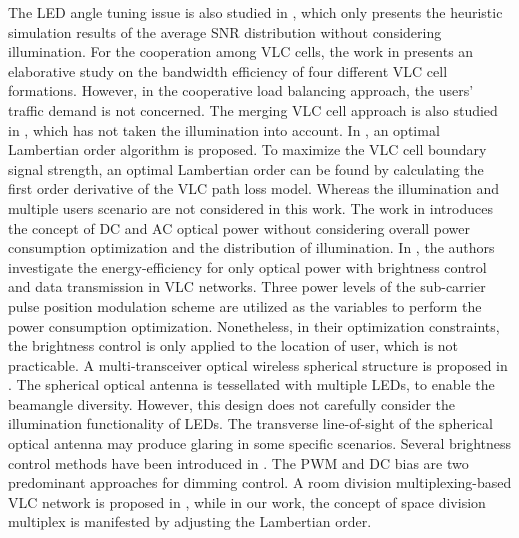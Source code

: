 \documentclass[10pt,journal]{IEEEtran}
\begin{document}
The LED angle tuning issue is also studied in \cite{tronghop2012modeling}, which only presents the heuristic simulation results of the average SNR distribution without considering illumination. For the cooperation among VLC cells, the work in \cite{li2015cooperative} presents an elaborative study on the bandwidth efficiency of four different VLC cell formations. However, in the cooperative load balancing approach, the users’ traffic demand is not concerned. The merging VLC cell approach is also studied in \cite{tao2015scheduling}, which has not taken the illumination into account. In \cite{wu2014cellular}, an optimal Lambertian order algorithm is proposed. To maximize the VLC cell boundary signal strength, an optimal Lambertian order can be found by calculating the first order derivative of the VLC path loss model. Whereas the illumination and multiple users scenario are not considered in this work. The work in \cite{rahaim2013sinr} introduces the concept of DC and AC optical power without considering overall power consumption optimization and the distribution of illumination. In \cite{din2014energy}, the authors investigate the energy-efficiency for only optical power with brightness control and data transmission in VLC networks. Three power levels of the sub-carrier pulse position modulation scheme are utilized as the variables to perform the power consumption optimization. Nonetheless, in their optimization constraints, the brightness control is only applied to the location of user, which is not practicable. A multi-transceiver optical wireless spherical structure is proposed in \cite{nakhkoob2009multi}. The spherical optical antenna is tessellated with multiple LEDs, to enable the beamangle diversity. However, this design does not carefully consider the illumination functionality of LEDs. The transverse line-of-sight of the spherical optical antenna may produce glaring in some specific scenarios. Several brightness control methods have been introduced in \cite{sugiyama2007brightness}. The PWM and DC bias are two predominant approaches for dimming control. A room division multiplexing-based VLC network is proposed in \cite{huang2013design}, while in our work, the concept of space division multiplex is manifested by adjusting the Lambertian order.
\end{document}
